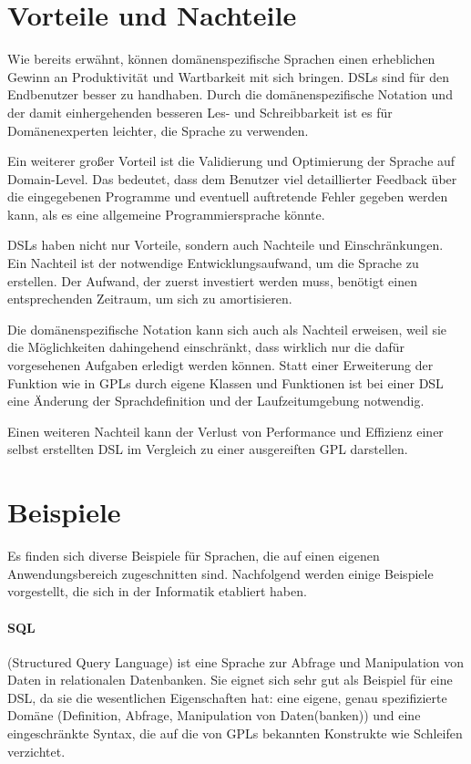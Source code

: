 \section{Vorteile und Nachteile}

Wie bereits erwähnt, können domänenspezifische Sprachen einen erheblichen Gewinn an Produktivität und Wartbarkeit mit sich bringen\cite{VaDe98}. DSLs sind für den Endbenutzer besser zu handhaben. Durch die domänenspezifische Notation und der damit einhergehenden besseren Les- und Schreibbarkeit ist es für Domänenexperten leichter, die Sprache zu verwenden. 

Ein weiterer großer Vorteil ist die Validierung und Optimierung der Sprache auf Domain-Level. Das bedeutet, dass dem Benutzer viel detaillierter Feedback über die eingegebenen Programme und eventuell auftretende Fehler gegeben werden kann, als es eine allgemeine Programmiersprache könnte\cite{VaDe00}.

DSLs haben nicht nur Vorteile, sondern auch Nachteile und Einschränkungen. Ein Nachteil ist der notwendige Entwicklungsaufwand, um die Sprache zu erstellen. Der Aufwand, der zuerst investiert werden muss, benötigt einen entsprechenden Zeitraum, um sich zu amortisieren.

Die domänenspezifische Notation kann sich auch als Nachteil erweisen, weil sie die Möglichkeiten dahingehend einschränkt, dass wirklich nur die dafür vorgesehenen Aufgaben erledigt werden können. Statt einer Erweiterung der Funktion wie in GPLs durch eigene Klassen und Funktionen ist bei einer DSL eine Änderung der Sprachdefinition und der Laufzeitumgebung notwendig.

Einen weiteren Nachteil kann der Verlust von Performance und Effizienz einer selbst erstellten DSL im Vergleich zu einer ausgereiften GPL darstellen\cite{VaDe00}.



\section{Beispiele}
\label{grundlagen_examples}

Es finden sich diverse Beispiele für Sprachen, die auf einen eigenen Anwendungsbereich zugeschnitten sind. Nachfolgend werden einige Beispiele vorgestellt, die sich in der Informatik etabliert haben.

\paragraph*{SQL}
(Structured Query Language) ist eine Sprache zur Abfrage und Manipulation von Daten in relationalen Datenbanken. Sie eignet sich sehr gut als Beispiel für eine DSL, da sie die wesentlichen Eigenschaften hat: eine eigene, genau spezifizierte Domäne (Definition, Abfrage, Manipulation von Daten(banken)) und eine eingeschränkte Syntax, die auf die von GPLs bekannten Konstrukte wie Schleifen verzichtet.

